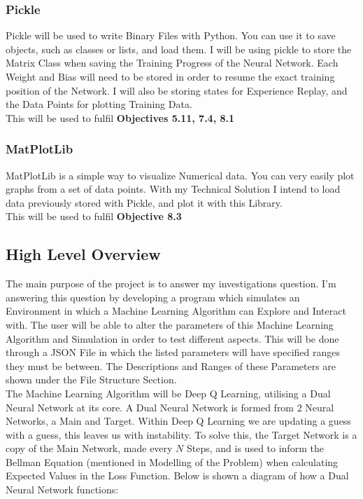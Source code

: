\begin{flushleft}
            \subsubsection*{Pickle}
            Pickle will be used to write Binary Files with Python. You can use it to save objects, such as classes
            or lists, and load them. I will be using pickle to store the Matrix Class when saving the Training Progress of
            the Neural Network. Each Weight and Bias will need to be stored in order to resume the exact training position of the
            Network. I will also be storing states for Experience Replay, and the Data Points for plotting Training Data. \\
            \vspace{0.2cm}
            This will be used to fulfil \textbf{Objectives 5.11, 7.4, 8.1} \\
            \subsubsection*{MatPlotLib}
            MatPlotLib is a simple way to visualize Numerical data. You can very easily plot graphs from a set of
            data points. With my Technical Solution I intend to load data previously stored with Pickle, and plot it with this Library. \\
            \vspace{0.2cm} 
            This will be used to fulfil \textbf{Objective 8.3} \\
        \subsection{High Level Overview}
            \large
            The main purpose of the project is to answer my investigations question. I'm answering this question by developing 
            a program which simulates an Environment in which a Machine Learning Algorithm can Explore and Interact with. The user
            will be able to alter the parameters of this Machine Learning Algorithm and Simulation in order to test different aspects. 
            This will be done through a JSON File in which the listed parameters will have specified ranges they must be between. The
            Descriptions and Ranges of these Parameters are shown under the File Structure Section. \\
            \vspace{0.2cm}
            The Machine Learning Algorithm will be Deep Q Learning, utilising a Dual Neural Network at its core. A Dual Neural Network
            is formed from 2 Neural Networks, a Main and Target. Within Deep Q Learning we are updating a guess with a guess,
            this leaves us with instability. To solve this, the Target Network is a copy of the Main Network, made every $N$ Steps, and is used to 
            inform the Bellman Equation (mentioned in Modelling of the Problem) when calculating Expected Values in the Loss Function. 
            Below is shown a diagram of how a Dual Neural Network functions: \\
            

\end{flushleft}
